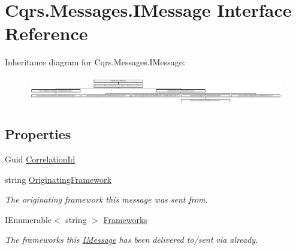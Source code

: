 \hypertarget{interfaceCqrs_1_1Messages_1_1IMessage}{}\section{Cqrs.\+Messages.\+I\+Message Interface Reference}
\label{interfaceCqrs_1_1Messages_1_1IMessage}
Inheritance diagram for Cqrs.\+Messages.\+I\+Message\+:\begin{figure}[H]
\begin{center}
\leavevmode
\includegraphics[height=1.250000cm]{interfaceCqrs_1_1Messages_1_1IMessage}
\end{center}
\end{figure}
\subsection*{Properties}
\begin{DoxyCompactItemize}
\item 
Guid \hyperlink{interfaceCqrs_1_1Messages_1_1IMessage_a9037d871a75ac76b190130aa56fe63a8_a9037d871a75ac76b190130aa56fe63a8}{Correlation\+Id}
\item 
string \hyperlink{interfaceCqrs_1_1Messages_1_1IMessage_aff9a2d35971384fb440954c3163eaeef_aff9a2d35971384fb440954c3163eaeef}{Originating\+Framework}
\begin{DoxyCompactList}\small\item\em The originating framework this message was sent from. \end{DoxyCompactList}\item 
I\+Enumerable$<$ string $>$ \hyperlink{interfaceCqrs_1_1Messages_1_1IMessage_af147de5bb9a480ba75b5bb9f0ef12132_af147de5bb9a480ba75b5bb9f0ef12132}{Frameworks}
\begin{DoxyCompactList}\small\item\em The frameworks this \hyperlink{interfaceCqrs_1_1Messages_1_1IMessage}{I\+Message} has been delivered to/sent via already. \end{DoxyCompactList}\end{DoxyCompactItemize}


